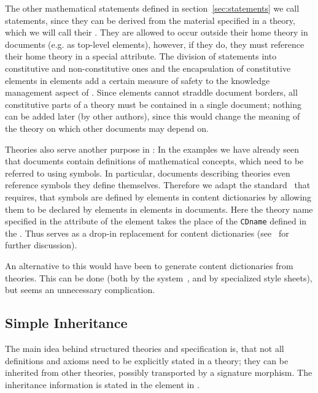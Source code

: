 The other mathematical statements defined in section~\ref{sec:statements} we call
{} statements, since they can be derived from the material
specified in a theory, which we will call their {}. They are allowed to occur outside their home
theory in {\omdoc} documents (e.g. as top-level elements), however, if they do,
they must reference their home theory in a special {}
attribute.  The division of statements into constitutive and non-constitutive ones
and the encapsulation of constitutive elements in {} elements add
a certain measure of safety to the knowledge management aspect of {\omdoc}.  Since
{\xml} elements cannot straddle document borders, all constitutive parts of a
theory must be contained in a single document; nothing can be added later (by
other authors), since this would change the meaning of the theory on which other
documents may depend on.

Theories also serve another purpose in {\omdoc}: In the examples we have already
seen that {\omdoc} documents contain definitions of mathematical concepts, which
need to be referred to using {\openmath} symbols. In particular, documents
describing theories even reference {\openmath} symbols they define themselves.
Therefore we adapt the {\openmath} standard~\cite{CapCoh:doms98} that requires,
that {\openmath} symbols are defined by {} elements in
{\openmath} content dictionaries by allowing them to be declared by
{} elements in {} elements in {\omdoc} documents.
Here the theory name specified in the {} attribute of the
{} element takes the place of the {\tt{CDname}} defined in the
{}. Thus {\omdoc} serves as a drop-in replacement for
{\openmath} content dictionaries (see~\cite{Kohlhase:oaifocdi00} for further
discussion).

An alternative to this would have been to generate {\openmath} content
dictionaries from {\omdoc} theories. This can be done (both by the {\mbase}
system~\cite{FraKoh:sdmaomkb00,KohFra:rkcimss00}, and by specialized {\xslt} style
sheets), but seems an unnecessary complication.

\subsection{Simple Inheritance}\label{sec:simple-inheritance}

The main idea behind structured theories and specification is, that not all
definitions and axioms need to be explicitly stated in a theory; they can be
inherited from other theories, possibly transported by a signature morphism. The
inheritance information is stated in the {} element in {\omdoc}.

